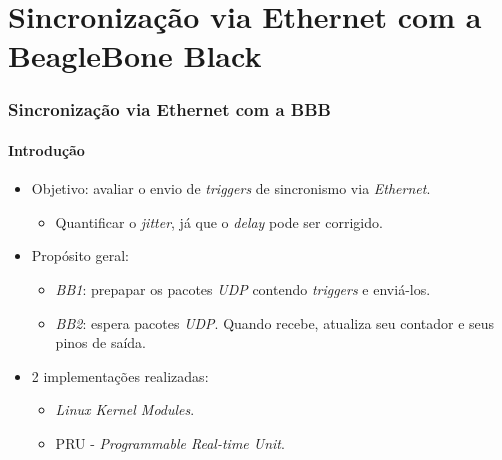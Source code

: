 \section {Sincronização via Ethernet com a BeagleBone Black}

\begin{frame}
\frametitle{Sincronização via Ethernet com a BBB }
\framesubtitle{Introdução}
\begin{itemize}
  \item Objetivo: avaliar o envio de \textit{triggers} de sincronismo via
  \textit{Ethernet}.
  \begin{itemize}
    \item Quantificar o \textit{jitter}, já que o \textit{delay} pode ser
    corrigido.
  \end{itemize}
  \item Propósito geral:
  \begin{itemize}
  \item \textit{BB1}: prepapar os
  pacotes \textit{UDP} contendo \textit{triggers} e enviá-los.
  
  \item \textit{BB2}: espera pacotes \textit{UDP}. Quando recebe, atualiza seu
  contador e seus pinos de saída.
  \end{itemize}
  \item 2 implementações realizadas: 
  \begin{itemize}
    \item \textit{Linux Kernel Modules}.
    \item PRU - \textit{Programmable Real-time Unit}.
  \end{itemize}
\end{itemize}
\end{frame}

